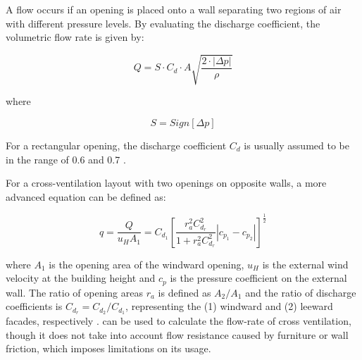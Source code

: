 %
%



A flow occurs if an opening is placed onto a wall separating two regions of air with different pressure levels.
By evaluating the discharge coefficient, the volumetric flow rate is given by:

\begin{equation}
Q  = S \cdot C_d \cdot A  \sqrt{ \dfrac{2\cdot|\Delta p|}{\rho}}
\end{equation}


where

\begin{equation}
S  = Sign [\Delta p]
\end{equation}

For a rectangular opening, the discharge coefficient $C_d$ is usually assumed to be in the range of \num{0.6} and \num{0.7} \citep{Chu2009}.



For a cross-ventilation layout with two openings on opposite walls, a more advanced equation can be defined as: 

\begin{equation}
q = \frac{Q}{u_{H} A_{1}} = C_{d_1} \left[ \frac{r_{a}^2 C_{d_r}^2 }{1+ r_{a}^2 C_{d_r}^2} |c_{p_1}-c_{p_2}| \right ] ^\frac{1}{2}
\label{eq:theory:flowrate_advanced}
\end{equation}

where $A_1$ is the opening area of the windward opening, $u_H$ is the external wind velocity at the building height and $c_p$ is the pressure coefficient on the external wall. The ratio of opening areas $r_a$ is defined as  $A_2/A_1$ and the ratio of discharge coefficients is $C_{d_r}  = C_{d_2}/C_{d_1}$, representing the (1) windward and (2) leeward facades, respectively \citep{Chu2014}.
 can be used to calculate the flow-rate of cross ventilation, though it does not take into account flow resistance caused by furniture or wall friction, which imposes limitations on its usage.

